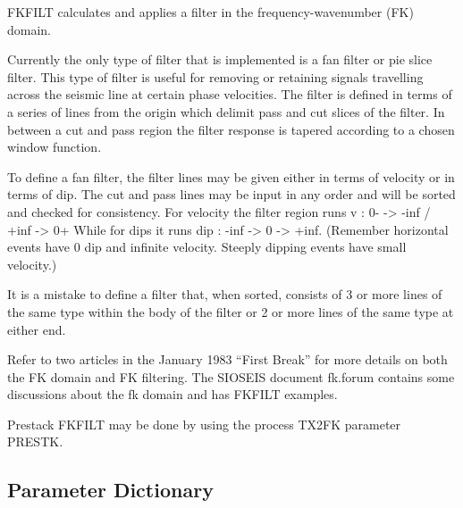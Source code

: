 FKFILT calculates and applies a filter in the frequency-wavenumber (FK)
domain.

Currently the only type of filter that is implemented is a fan filter or
pie slice filter.  This type of filter is useful for removing or
retaining signals travelling across the seismic line at certain phase
velocities.  The filter is defined in terms of a series of lines from
the origin which delimit pass and cut slices of the filter.  In between
a cut and pass region the filter response is tapered according to a
chosen window function.

To define a fan filter, the filter lines may be given either in terms of
velocity or in terms of dip. The cut and pass lines may be input in any
order and will be sorted and checked for consistency.   For velocity the
filter region runs
                    v :  0- -> -inf / +inf -> 0+
While for dips it runs
                  dip :  -inf -> 0 -> +inf.
(Remember horizontal events have 0 dip and infinite velocity.  Steeply
dipping events have small velocity.)

It is a mistake to define a filter that, when sorted, consists of 3 or
more lines of the same type within the body of the filter or 2 or more
lines of the same type at either end.

Refer to two articles in the January 1983 ``First Break'' for more details
on both the FK domain and FK filtering.  The SIOSEIS document fk.forum
contains some discussions about the fk domain and has FKFILT examples.

Prestack FKFILT may be done by using the process TX2FK parameter PRESTK.


\subsection{Parameter Dictionary}

